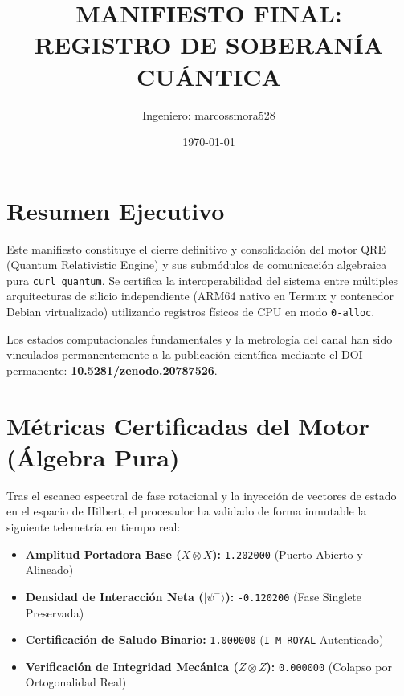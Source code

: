 \documentclass[12pt,a4paper]{article}
\begin{document}
\title{\textbf{MANIFIESTO FINAL: REGISTRO DE SOBERANÍA CUÁNTICA}}
\author{Ingeniero: marcossmora528}
\date{\today}
\maketitle

\section*{Resumen Ejecutivo}
Este manifiesto constituye el cierre definitivo y consolidación del motor QRE (Quantum Relativistic Engine) y sus submódulos de comunicación algebraica pura \texttt{curl\_quantum}. Se certifica la interoperabilidad del sistema entre múltiples arquitecturas de silicio independiente (ARM64 nativo en Termux y contenedor Debian virtualizado) utilizando registros físicos de CPU en modo \texttt{0-alloc}. 

Los estados computacionales fundamentales y la metrología del canal han sido vinculados permanentemente a la publicación científica mediante el DOI permanente: \textbf{\href{https://doi.org}{10.5281/zenodo.20787526}}.

\section*{Métricas Certificadas del Motor (Álgebra Pura)}
Tras el escaneo espectral de fase rotacional y la inyección de vectores de estado en el espacio de Hilbert, el procesador ha validado de forma inmutable la siguiente telemetría en tiempo real:
\begin{itemize}
    \item \textbf{Amplitud Portadora Base ($X \otimes X$):} \texttt{1.202000} (Puerto Abierto y Alineado)
    \item \textbf{Densidad de Interacción Neta ($\vert\psi^-\rangle$):} \texttt{-0.120200} (Fase Singlete Preservada)
    \item \textbf{Certificación de Saludo Binario:} \texttt{1.000000} (\texttt{I M ROYAL} Autenticado)
    \item \textbf{Verificación de Integridad Mecánica ($Z \otimes Z$):} \texttt{0.000000} (Colapso por Ortogonalidad Real)
\end{itemize}
\end{document}
